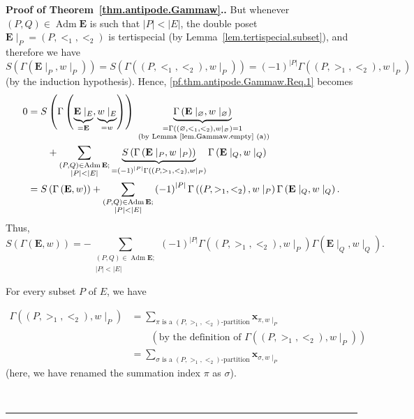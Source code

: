 \documentclass[numbers=enddot,12pt,final,onecolumn,notitlepage,abstracton]{scrartcl}%
\theoremstyle{definition}
\newenvironment{proof}[1][Proof]{\noindent\textbf{#1.} }{\ \rule{0.5em}{0.5em}}
\let\sumnonlimits\sum
\renewcommand{\sum}{\sumnonlimits\limits}
\newcommand{\xx}{{\mathbf{x}}}
\newcommand{\Adm}{\operatorname{Adm}}
\newcommand{\EE}{{\mathbf{E}}}
\begin{document}
\begin{proof}[Proof of Theorem~\ref{thm.antipode.Gammaw}.]
But whenever $\left(P, Q\right) \in \Adm \EE$ is such that
$\left|P\right| < \left|E\right|$, the double poset
$\EE\mid_P = \left(P, <_1, <_2\right)$ is tertispecial
(by Lemma~\ref{lem.tertispecial.subset}), and
therefore we have
$S\left(\Gamma\left(\EE\mid_P, w\mid_P\right)\right)
= S\left(\Gamma\left(\left(P, <_1, <_2\right), w\mid_P\right)\right)
= \left(-1\right)^{\left|P\right|}
\Gamma\left(\left(P, >_1, <_2\right), w\mid_P\right)$
(by the induction hypothesis).
Hence,
\eqref{pf.thm.antipode.Gammaw.Req.1} becomes
\begin{align}
0
&= S \left(\Gamma\left(\underbrace{\EE\mid_E}_{=\EE},
           \underbrace{w\mid_E}_{=w}\right)\right)
  \underbrace{\Gamma\left(\EE\mid_\varnothing, w\mid_\varnothing\right)
             }_{\substack{
             =\Gamma\left(\left(\varnothing, <_1, <_2\right), w\mid_\varnothing\right)
             =1 \\ \text{ (by Lemma \ref{lem.Gammaw.empty} (a))}}}
     \nonumber \\
& \qquad + \sum_{\substack{\left(P, Q\right) \in \Adm \EE ; \\
                  \left|P\right| < \left|E\right|}}
  \underbrace{S\left(\Gamma\left(\EE\mid_P, w\mid_P\right)\right)
             }_{= \left(-1\right)^{\left|P\right|}
                  \Gamma\left(\left(P, >_1, <_2\right), w\mid_P\right)}
  \Gamma\left(\EE\mid_Q, w\mid_Q\right)
     \nonumber \\
& = S\left(\Gamma\left(\EE, w\right)\right)
  + \sum_{\substack{\left(P, Q\right) \in \Adm \EE ; \\
                  \left|P\right| < \left|E\right|}}
  \left(-1\right)^{\left|P\right|}
  \Gamma\left(\left(P, >_1, <_2\right), w\mid_P\right)
  \Gamma\left(\EE\mid_Q, w\mid_Q\right) .
\nonumber
\end{align}
Thus,
\begin{equation}
S\left(\Gamma\left(\EE, w\right)\right)
= - \sum_{\substack{\left(P, Q\right) \in \Adm \EE ; \\
                  \left|P\right| < \left|E\right|}}
\left(-1\right)^{\left|P\right|}
\Gamma\left(\left(P, >_1, <_2\right), w\mid_P\right)
\Gamma\left(\EE\mid_Q, w\mid_Q\right) .
\label{pf.thm.antipode.Gammaw.Seq}
\end{equation}


For every subset $P$ of $E$, we have

\begin{align}
\Gamma\left(\left(P, >_1, <_2\right), w\mid_P\right)
&= \sum_{\pi \text{ is a }\left(P, >_1, <_2\right)\text{-partition}}
\xx_{\pi, w\mid_P}
\nonumber \\
& \qquad \left(\text{by the definition of }
 \Gamma\left(\left(P, >_1, <_2\right), w\mid_P\right) \right)
\nonumber \\
& = \sum_{\sigma \text{ is a }\left(P, >_1, <_2\right)\text{-partition}}
\xx_{\sigma, w\mid_P}
\label{pf.thm.antipode.Gammaw.Req.pf.Gamma1}
\end{align}
(here, we have renamed the summation index $\pi$ as
$\sigma$).


\end{proof}
\end{document}
